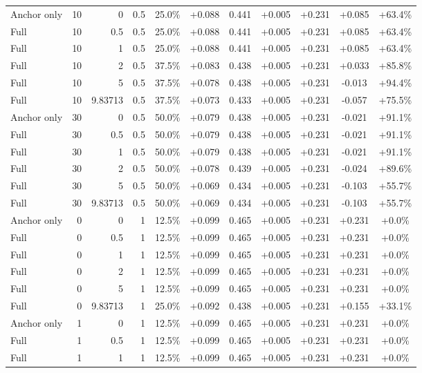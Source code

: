 \begin{table}[htbp]
\begin{tabular}{lrrrccccccc}
Anchor only & 10 & 0 & 0.5 & 25.0\% & +0.088 & 0.441 & +0.005 & +0.231 & +0.085 & +63.4\% \\
Full & 10 & 0.5 & 0.5 & 25.0\% & +0.088 & 0.441 & +0.005 & +0.231 & +0.085 & +63.4\% \\
Full & 10 & 1 & 0.5 & 25.0\% & +0.088 & 0.441 & +0.005 & +0.231 & +0.085 & +63.4\% \\
Full & 10 & 2 & 0.5 & 37.5\% & +0.083 & 0.438 & +0.005 & +0.231 & +0.033 & +85.8\% \\
Full & 10 & 5 & 0.5 & 37.5\% & +0.078 & 0.438 & +0.005 & +0.231 & -0.013 & +94.4\% \\
Full & 10 & 9.83713 & 0.5 & 37.5\% & +0.073 & 0.433 & +0.005 & +0.231 & -0.057 & +75.5\% \\
Anchor only & 30 & 0 & 0.5 & 50.0\% & +0.079 & 0.438 & +0.005 & +0.231 & -0.021 & +91.1\% \\
Full & 30 & 0.5 & 0.5 & 50.0\% & +0.079 & 0.438 & +0.005 & +0.231 & -0.021 & +91.1\% \\
Full & 30 & 1 & 0.5 & 50.0\% & +0.079 & 0.438 & +0.005 & +0.231 & -0.021 & +91.1\% \\
Full & 30 & 2 & 0.5 & 50.0\% & +0.078 & 0.439 & +0.005 & +0.231 & -0.024 & +89.6\% \\
Full & 30 & 5 & 0.5 & 50.0\% & +0.069 & 0.434 & +0.005 & +0.231 & -0.103 & +55.7\% \\
Full & 30 & 9.83713 & 0.5 & 50.0\% & +0.069 & 0.434 & +0.005 & +0.231 & -0.103 & +55.7\% \\
Anchor only & 0 & 0 & 1 & 12.5\% & +0.099 & 0.465 & +0.005 & +0.231 & +0.231 & +0.0\% \\
Full & 0 & 0.5 & 1 & 12.5\% & +0.099 & 0.465 & +0.005 & +0.231 & +0.231 & +0.0\% \\
Full & 0 & 1 & 1 & 12.5\% & +0.099 & 0.465 & +0.005 & +0.231 & +0.231 & +0.0\% \\
Full & 0 & 2 & 1 & 12.5\% & +0.099 & 0.465 & +0.005 & +0.231 & +0.231 & +0.0\% \\
Full & 0 & 5 & 1 & 12.5\% & +0.099 & 0.465 & +0.005 & +0.231 & +0.231 & +0.0\% \\
Full & 0 & 9.83713 & 1 & 25.0\% & +0.092 & 0.438 & +0.005 & +0.231 & +0.155 & +33.1\% \\
Anchor only & 1 & 0 & 1 & 12.5\% & +0.099 & 0.465 & +0.005 & +0.231 & +0.231 & +0.0\% \\
Full & 1 & 0.5 & 1 & 12.5\% & +0.099 & 0.465 & +0.005 & +0.231 & +0.231 & +0.0\% \\
Full & 1 & 1 & 1 & 12.5\% & +0.099 & 0.465 & +0.005 & +0.231 & +0.231 & +0.0\% \\

\end{tabular}
\end{table}
